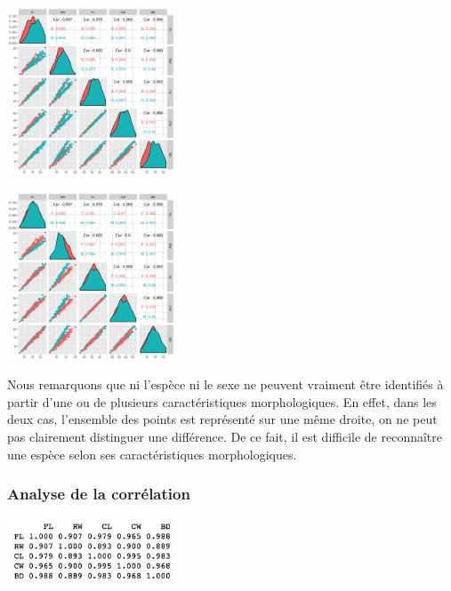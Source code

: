 \documentclass[10pt]{article}
\begin{document}
	\begin{minipage}[t]{0.6\textwidth}
		\includegraphics[width=50mm]{Figures/Crabs/matricial_plot_sp.png}
	\end{minipage}
	\begin{minipage}[t]{0.6\textwidth}
		\includegraphics[width=50mm]{Figures/Crabs/matricial_plot_sex.png}
	\end{minipage}
	\begin{center}
		\label{fig:multiplot_crabs__sp_sex}
	\end{center}
	
	Nous remarquons que ni l'espèce ni le sexe ne peuvent vraiment être identifiés à partir d'une ou de plusieurs caractéristiques morphologiques.
	En effet, dans les deux cas, l'ensemble des points est représenté sur une même droite, on ne peut pas clairement distinguer une différence. De ce fait, il est difficile de reconnaître une espèce selon ses caractéristiques morphologiques.
	
	\subsubsection{Analyse de la corrélation}
	
	\begin{center}
		\includegraphics[width=50mm]{Figures/Crabs/cor_crabsquant.png}
		\label{fig:cor_carbsquant}
	\end{center}
	
\end{document}
